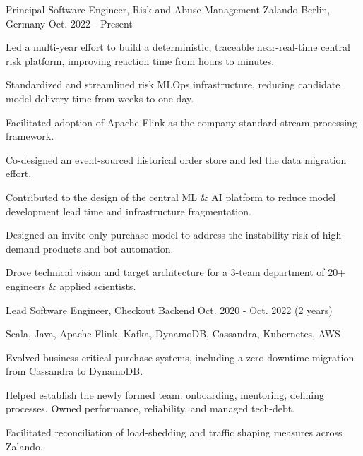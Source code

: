 

\begin{cventries}

  \cventry
    {Principal Software Engineer, Risk and Abuse Management} %
    {Zalando} %
    {Berlin, Germany} %
    {Oct. 2022 - Present} %
    {
      \begin{cvitems} %
	  \item {Led a multi-year effort to build a deterministic, traceable near-real-time central risk platform, improving reaction time from hours to minutes.}
	  \item {Standardized and streamlined risk MLOps infrastructure, reducing candidate model delivery time from weeks to one day.}
	  \item {Facilitated adoption of Apache Flink as the company-standard stream processing framework.}
	  \item {Co-designed an event-sourced historical order store and led the data migration effort.}
	  \item {Contributed to the design of the central ML \& AI platform to reduce model development lead time and infrastructure fragmentation.}
	  \item {Designed an invite-only purchase model to address the instability risk of high-demand products and bot automation.}
	  \item {Drove technical vision and target architecture for a 3-team department of 20+ engineers \& applied scientists.}
      \end{cvitems}
    }

  \cventry
    {Lead Software Engineer, Checkout Backend} %
    {} %
    {} %
    {Oct. 2020 - Oct. 2022 (2 years)} %
    {
      \begin{cvitems} %
        \item {Scala, Java, Apache Flink, Kafka, DynamoDB, Cassandra, Kubernetes, AWS}
        \item {Evolved business-critical purchase systems, including a zero-downtime migration from Cassandra to DynamoDB.}
        \item {Helped establish the newly formed team: onboarding, mentoring, defining processes. Owned performance, reliability, and managed tech-debt.}
        \item {Facilitated reconciliation of load-shedding and traffic shaping measures across Zalando.}
      \end{cvitems}
    }


\end{cventries}
